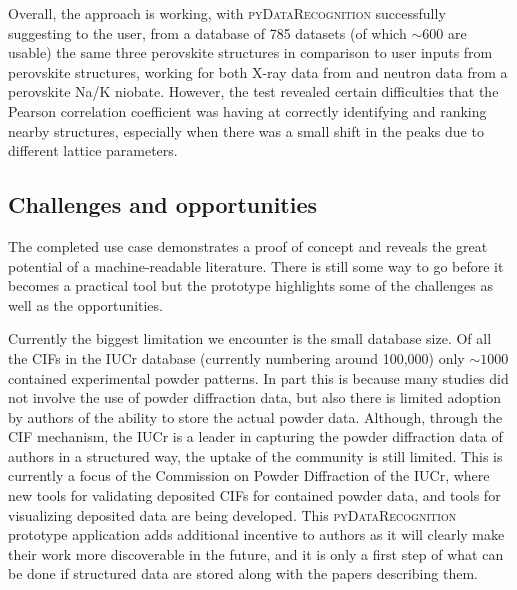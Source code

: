 \documentclass[preprint]{iucr}
\newcommand{\pydr}{\textsc{pyDataRecognition}\xspace}
\begin{document}
Overall, the approach is working, with \pydr successfully suggesting to the user, from a database of 785 datasets (of which $\sim 600$ are usable) the same three perovskite structures in comparison to user inputs from perovskite structures, working for both X-ray data from  and neutron data from a perovskite Na/K niobate.   However, the test revealed certain difficulties that the Pearson correlation coefficient was having at correctly identifying and ranking nearby structures, especially when there was a small shift in the peaks due to different lattice parameters.

\subsection{Challenges and opportunities}
\label{sec:challengesandopportunities}

The completed use case demonstrates a proof of concept and reveals the great potential of a machine-readable literature.  There is still some way to go before it becomes a practical tool but the prototype highlights some of the challenges as well as the opportunities.

Currently the biggest limitation we encounter is the small database size. Of all the CIFs in the IUCr database (currently numbering around 100,000) only $\sim 1000$  contained experimental powder patterns. In part this is because many studies did not involve the use of powder diffraction data, but also there is limited adoption by authors of the ability to store the actual powder data.  Although, through the CIF mechanism, the IUCr is a leader in capturing the powder diffraction data of authors in a structured way, the uptake of the community is still limited.  This is currently a focus of the Commission on Powder Diffraction of the IUCr, where new tools for validating deposited CIFs for contained powder data, and tools for visualizing deposited data are being developed.  This \pydr prototype application adds additional incentive to authors as it will clearly make their work more discoverable in the future, and it is only a first step of what can be done if structured data are stored along with the papers describing them.
\end{document}
